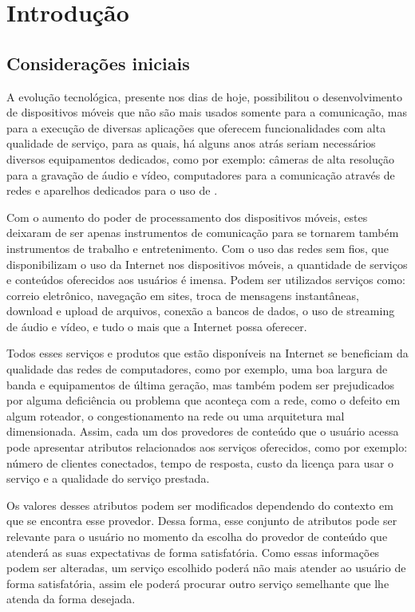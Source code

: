 \chapter{Introdução}
\section{Considerações iniciais}
A evolução tecnológica, presente nos dias de hoje, possibilitou o desenvolvimento de dispositivos móveis que não são mais usados somente para a comunicação, mas para a execução de diversas aplicações que oferecem funcionalidades com alta qualidade de serviço, para as quais, há alguns anos atrás seriam necessários diversos equipamentos dedicados, como por exemplo: câmeras de alta resolução para a gravação de áudio e vídeo, computadores para a comunicação através de redes  e aparelhos dedicados para o uso de .

Com o aumento do poder de processamento dos dispositivos móveis, estes deixaram de ser apenas instrumentos de comunicação para se tornarem também instrumentos de trabalho e entretenimento.
Com o uso das redes sem fios, que disponibilizam o uso da Internet nos dispositivos móveis, a quantidade de serviços e conteúdos oferecidos aos usuários é imensa. Podem ser utilizados serviços como: correio eletrônico, navegação em sites, troca de mensagens instantâneas, download e upload de arquivos, conexão a bancos de dados, o uso de streaming de áudio e vídeo, e tudo o mais que a Internet possa oferecer.

Todos esses serviços e produtos que estão disponíveis na Internet se beneficiam da qualidade das redes de computadores, como por exemplo, uma boa largura de banda e equipamentos de última geração, mas também podem ser prejudicados por alguma deficiência ou problema que aconteça com a rede, como o defeito em algum roteador, o congestionamento na rede ou uma arquitetura mal dimensionada. Assim, cada um dos provedores de conteúdo que o usuário acessa pode apresentar atributos relacionados aos serviços oferecidos, como por exemplo: número de clientes conectados, tempo de resposta, custo da licença para usar o serviço e a qualidade do serviço prestada.

Os valores desses atributos podem ser modificados dependendo do contexto em que se encontra esse provedor. Dessa forma, esse conjunto de atributos pode ser relevante para o usuário no momento da escolha do provedor de conteúdo que atenderá as suas expectativas de forma satisfatória. Como essas informações podem ser alteradas, um serviço escolhido poderá não mais atender ao usuário de forma satisfatória, assim ele poderá procurar outro serviço semelhante que lhe atenda da forma desejada.

